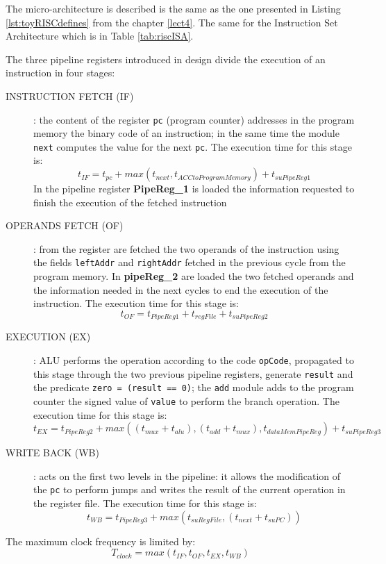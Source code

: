 The micro-architecture is described is the same as the one presented in Listing \ref{lst:toyRISCdefines} from the chapter \ref{lect4}. The same for the Instruction Set Architecture which is in Table \ref{tab:riscISA}.


The three pipeline registers introduced in design divide the execution of an instruction in four stages:
\begin{description}
    \item[INSTRUCTION FETCH (IF)]: the content of the register {\tt pc} (program counter) addresses in the program memory the binary code of an instruction; in the same time the module {\tt next} computes the value for the next {\tt pc}. The execution time for this stage is:
        $$t_{IF} = t_{pc} + max(t_{next}, t_{ACCto Program Memory}) + t_{suPipeReg1}$$
        In the pipeline register {\bf PipeReg\_1} is loaded the information requested to finish the execution of the fetched instruction

        
    \item[OPERANDS FETCH (OF)]: from the register are fetched the two operands of the instruction using the fields {\tt leftAddr} and {\tt rightAddr} fetched in the previous cycle from the program memory. In {\bf pipeReg\_2} are loaded the two fetched operands and the information needed in the next cycles to end the execution of the instruction. The execution time for this stage is:
        $$t_{OF} = t_{PipeReg1} + t_{regFile} + t_{suPipeReg2}$$


        
    \item[EXECUTION (EX)]: ALU performs the operation according to the code {\tt opCode}, propagated to this stage through the two previous  pipeline registers,  generate {\tt result} and the predicate {\tt zero = (result == 0)}; the {\tt add} module adds to the program counter the signed value of {\tt value} to perform the branch operation.  The execution time for this stage is:
        $$t_{EX} = t_{PipeReg2} + max((t_{mux}+t_{alu}),  (t_{add}+t_{mux}), t_{dataMemPipeReg}) + t_{suPipeReg3}$$
    \item[WRITE BACK (WB)]: acts on the first two levels in the pipeline: it allows the modification of the {\tt pc} to perform jumps and writes the result of the current operation in the register file. The execution time for this stage is:
        $$t_{WB} = t_{PipeReg3} +  max(t_{suRegFile}, (t_{next} + t_{suPC}))$$
\end{description}
The maximum clock frequency is limited by:
$$T_{clock} = max(t_{IF}, t_{OF}, t_{EX}, t_{WB})$$



